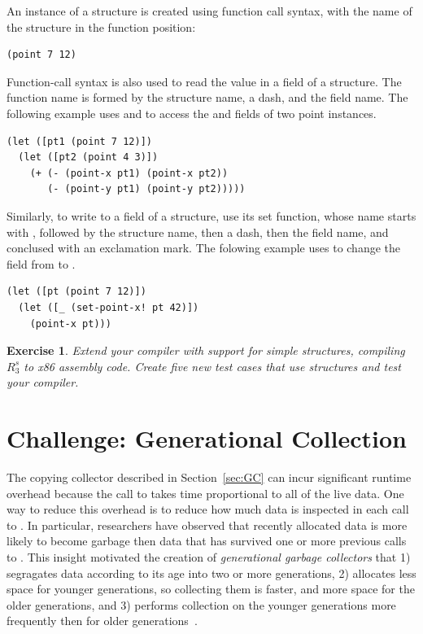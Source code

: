 \documentclass[11pt]{book}
\newtheorem{exercise}[theorem]{Exercise}
\begin{document}
An instance of a structure is created using function call syntax, with
the name of the structure in the function position:
\begin{lstlisting}
(point 7 12)
\end{lstlisting}
Function-call syntax is also used to read the value in a field of a
structure. The function name is formed by the structure name, a dash,
and the field name. The following example uses  and
 to access the  and  fields of two point
instances.
\begin{center}
\begin{lstlisting}
(let ([pt1 (point 7 12)])
  (let ([pt2 (point 4 3)])
    (+ (- (point-x pt1) (point-x pt2))
       (- (point-y pt1) (point-y pt2)))))
\end{lstlisting}
\end{center}
Similarly, to write to a field of a structure, use its set function,
whose name starts with , followed by the structure name,
then a dash, then the field name, and conclused with an exclamation
mark. The folowing example uses  to change the
 field from  to .
\begin{center}
  \begin{lstlisting}
(let ([pt (point 7 12)])
  (let ([_ (set-point-x! pt 42)])
    (point-x pt)))
\end{lstlisting}
\end{center}

\begin{exercise}\normalfont
  Extend your compiler with support for simple structures, compiling
  $R^s_3$ to x86 assembly code. Create five new test cases that use
  structures and test your compiler.
\end{exercise}


\section{Challenge: Generational Collection}

The copying collector described in Section~\ref{sec:GC} can incur
significant runtime overhead because the call to  takes
time proportional to all of the live data. One way to reduce this
overhead is to reduce how much data is inspected in each call to
. In particular, researchers have observed that recently
allocated data is more likely to become garbage then data that has
survived one or more previous calls to . This insight
motivated the creation of \emph{generational garbage collectors}
 that
1) segragates data according to its age into two or more generations,
2) allocates less space for younger generations, so collecting them is
faster, and more space for the older generations, and 3) performs
collection on the younger generations more frequently then for older
generations~\citep{Wilson:1992fk}.
\end{document}
